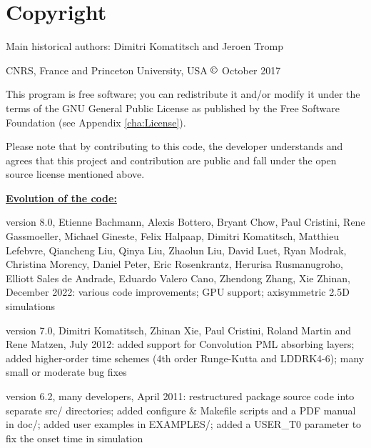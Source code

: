 
\chapter*{Copyright}

Main historical authors: Dimitri Komatitsch and Jeroen Tromp

CNRS, France and Princeton University, USA\newline
$\copyright$ October 2017\newline

\noindent
This program is free software; you can redistribute it and/or modify
it under the terms of the GNU General Public License as published
by the Free Software Foundation (see Appendix \ref{cha:License}).\newline

\noindent
Please note that by contributing to this code, the developer understands and agrees that this project and contribution
are public and fall under the open source license mentioned above.\newline

\noindent
\textbf{\underline{Evolution of the code:}}\newline

version 8.0, Etienne Bachmann, Alexis Bottero, Bryant Chow, Paul Cristini, Rene Gassmoeller, Michael Gineste,
Felix Halpaap, Dimitri Komatitsch, Matthieu Lefebvre, Qiancheng Liu, Qinya Liu, Zhaolun Liu,
David Luet, Ryan Modrak, Christina Morency, Daniel Peter, Eric Rosenkrantz, Herurisa Rusmanugroho,
Elliott Sales de Andrade, Eduardo Valero Cano, Zhendong Zhang, Xie Zhinan, December 2022:\newline
various code improvements;
GPU support;
axisymmetric 2.5D simulations\newline

version 7.0, Dimitri Komatitsch, Zhinan Xie, Paul Cristini, Roland Martin and Rene Matzen, July 2012:\newline
added support for Convolution PML absorbing layers;
added higher-order time schemes (4th order Runge-Kutta and LDDRK4-6);
many small or moderate bug fixes\newline

version 6.2, many developers, April 2011:\newline
restructured package source code into separate src/ directories;
added configure \& Makefile scripts and a PDF manual in doc/;
added user examples in EXAMPLES/;
added a USER\_T0 parameter to fix the onset time in simulation\newline

